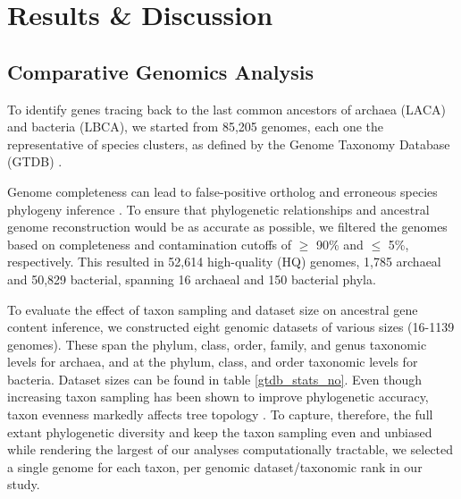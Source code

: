 \section{Results \& Discussion}

\subsection*{Comparative Genomics Analysis}

\normalsize

To identify genes tracing back to the last common ancestors of archaea (LACA) and bacteria (LBCA), we started from 85,205 genomes, each one the representative of species clusters, as defined by the Genome Taxonomy Database (GTDB) \cite{parks2018, parks2020, parks2022, rinke2021}. 

Genome completeness can lead to false-positive ortholog and erroneous species phylogeny inference \cite{kuzniar2008}. To ensure that phylogenetic relationships and ancestral genome reconstruction would be as accurate as possible, we filtered the genomes based on completeness and contamination cutoffs of $\geq$ 90\% and $\leq$ 5\%, respectively. This resulted in 52,614 high-quality (HQ) genomes, 1,785 archaeal and 50,829 bacterial, spanning 16 archaeal and 150 bacterial phyla. 

To evaluate the effect of taxon sampling and dataset size on ancestral gene content inference, we constructed eight genomic datasets of various sizes (16-1139 genomes). These span the phylum, class, order, family, and genus taxonomic levels for archaea, and at the phylum, class, and order taxonomic levels for bacteria. Dataset sizes can be found in table \ref{gtdb_stats_no}. Even though increasing taxon sampling has been shown to improve phylogenetic accuracy, taxon evenness markedly affects tree topology \cite{graybeal1998, martinez-gutierrez2021}. To capture, therefore, the full extant phylogenetic diversity and keep the taxon sampling even and unbiased while rendering the largest of our analyses computationally tractable, we selected a single genome for each taxon, per genomic dataset/taxonomic rank in our study.

